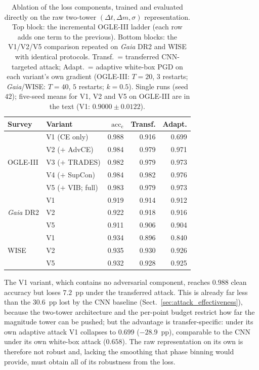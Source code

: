 \documentclass{aa}
\begin{document}
\begin{table}
\centering
\caption{Ablation of the loss components, trained and evaluated directly
on the raw two-tower $(\Delta t, \Delta m, \sigma)$ representation. Top
block: the incremental OGLE-III ladder (each row adds one term to the
previous). Bottom blocks: the V1/V2/V5 comparison repeated on
\textit{Gaia} DR2 and WISE with identical protocols. Transf.\ = transferred CNN-targeted attack;
Adapt.\ = adaptive white-box PGD on each variant's own gradient
(OGLE-III: $T=20$, $3$ restarts; \textit{Gaia}/WISE: $T=40$, $5$
restarts; $k=0.5$). Single runs (seed $42$); five-seed means for V1, V2
and V5 on OGLE-III are in the text (V1: $0.9000 \pm 0.0122$).}
\label{tab:ablation_robust}
\small
\setlength{\tabcolsep}{4pt}
\begin{tabular}{llrrr}
\toprule
Survey & Variant & $\mathrm{acc}_{\mathrm{c}}$ & Transf. & Adapt. \\
\midrule
\multirow{5}{*}{OGLE-III}
 & V1 (CE only)          & 0.988 & 0.916 & 0.699 \\
 & V2 ($+$ AdvCE)        & 0.984 & 0.979 & 0.971 \\
 & V3 ($+$ TRADES)       & 0.982 & 0.979 & 0.973 \\
 & V4 ($+$ SupCon)       & 0.984 & 0.982 & 0.976 \\
 & V5 ($+$ VIB; full)    & 0.983 & 0.979 & 0.973 \\
\midrule
\multirow{3}{*}{\textit{Gaia} DR2}
 & V1 & 0.919 & 0.914 & 0.912 \\
 & V2 & 0.922 & 0.918 & 0.916 \\
 & V5 & 0.911 & 0.906 & 0.904 \\
\midrule
\multirow{3}{*}{WISE}
 & V1 & 0.934 & 0.896 & 0.840 \\
 & V2 & 0.935 & 0.930 & 0.926 \\
 & V5 & 0.932 & 0.928 & 0.925 \\
\bottomrule
\end{tabular}
\end{table}

The V1 variant, which contains no adversarial component, reaches $0.988$
clean accuracy but loses $7.2$~pp under the transferred attack. This is
already far less than the $30.6$~pp lost by the CNN baseline
(Sect.~\ref{sec:attack_effectiveness}), because the two-tower architecture
and the per-point budget restrict how far the magnitude tower can be
pushed; but the advantage is transfer-specific: under its own adaptive
attack V1 collapses to $0.699$ ($-28.9$~pp), comparable to the CNN under
its own white-box attack ($0.658$). The raw representation on its own is
therefore not robust and, lacking the smoothing that phase binning would
provide, must obtain all of its robustness from the loss.
\end{document}
